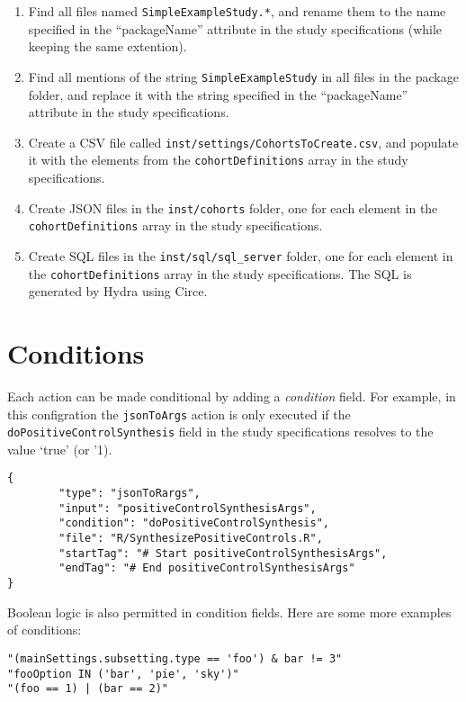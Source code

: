 \documentclass[]{article}
\providecommand{\tightlist}{%
  \setlength{\itemsep}{0pt}\setlength{\parskip}{0pt}}
\begin{document}
\begin{enumerate}
\def\labelenumi{\arabic{enumi}.}
\tightlist
\item
  Find all files named \texttt{SimpleExampleStudy.*}, and rename them to
  the name specified in the ``packageName'' attribute in the study
  specifications (while keeping the same extention).
\item
  Find all mentions of the string \texttt{SimpleExampleStudy} in all
  files in the package folder, and replace it with the string specified
  in the ``packageName'' attribute in the study specifications.
\item
  Create a CSV file called \texttt{inst/settings/CohortsToCreate.csv},
  and populate it with the elements from the \texttt{cohortDefinitions}
  array in the study specifications.
\item
  Create JSON files in the \texttt{inst/cohorts} folder, one for each
  element in the \texttt{cohortDefinitions} array in the study
  specifications.
\item
  Create SQL files in the \texttt{inst/sql/sql\_server} folder, one for
  each element in the \texttt{cohortDefinitions} array in the study
  specifications. The SQL is generated by Hydra using Circe.
\end{enumerate}

\hypertarget{conditions}{%
\section{Conditions}\label{conditions}}

Each action can be made conditional by adding a \emph{condition} field.
For example, in this configration the \texttt{jsonToArgs} action is only
executed if the \texttt{doPositiveControlSynthesis} field in the study
specifications resolves to the value `true' (or '1).

\begin{verbatim}
{
        "type": "jsonToRargs",
        "input": "positiveControlSynthesisArgs",
        "condition": "doPositiveControlSynthesis",
        "file": "R/SynthesizePositiveControls.R",
        "startTag": "# Start positiveControlSynthesisArgs",
        "endTag": "# End positiveControlSynthesisArgs"
}
\end{verbatim}

Boolean logic is also permitted in condition fields. Here are some more
examples of conditions:

\begin{verbatim}
"(mainSettings.subsetting.type == 'foo') & bar != 3"
"fooOption IN ('bar', 'pie', 'sky')"
"(foo == 1) | (bar == 2)"
\end{verbatim}
\end{document}
